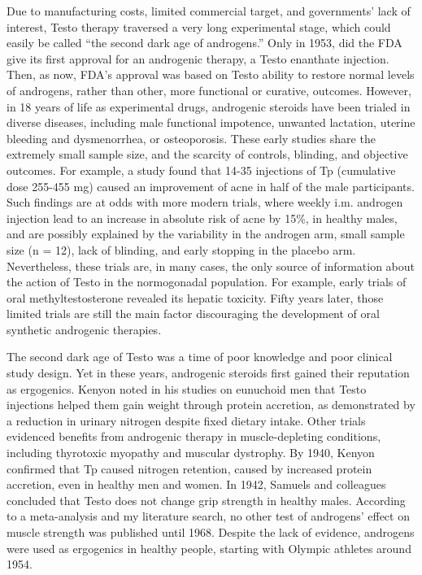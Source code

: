 \documentclass[12pt,english]{report}\usepackage[]{graphicx}\usepackage[]{color}
\begin{document}
Due to manufacturing costs, limited commercial target, and governments'
lack of interest, Testo therapy traversed a very long experimental
stage, which could easily be called ``the second dark age of androgens.''
Only in 1953, did the FDA give its first approval for an androgenic
therapy, a Testo enanthate injection. Then, as now, FDA's approval
was based on Testo ability to restore normal levels of androgens,
rather than other, more functional or curative, outcomes\citep{endopharmaceuticalssolutionsinc.2014delatestryl}.
However, in 18 years of life as experimental drugs, androgenic steroids
have been trialed in diverse diseases, including male functional impotence\citep{spence1940testosterone},
unwanted lactation\citep{kurzrok1938inhibition}, uterine bleeding
and dysmenorrhea\citep{black1942use}, or osteoporosis\citep{reifenstein1947metabolic}.
These early studies share the extremely small sample size, and the
scarcity of controls, blinding, and objective outcomes. For example,
a study found that 14-35 injections of Tp (cumulative dose 255-455
mg) caused an improvement of acne in half of the male participants\citep{molitch1938treatment}.
Such findings are at odds with more modern trials, where weekly i.m.
androgen injection lead to an increase in absolute risk of acne by
15\%, in healthy males\citep{mommers2008male}, and are possibly explained
by the variability in the androgen arm, small sample size (n = 12),
lack of blinding, and early stopping in the placebo arm. Nevertheless,
these trials are, in many cases, the only source of information about
the action of Testo in the normogonadal population. For example, early
trials of oral methyltestosterone revealed its hepatic toxicity. Fifty
years later, those limited trials are still the main factor discouraging
the development of oral synthetic androgenic therapies.

The second dark age of Testo was a time of poor knowledge and poor
clinical study design. Yet in these years, androgenic steroids first
gained their reputation as ergogenics. Kenyon noted in his studies
on eunuchoid men that Testo injections helped them gain weight through
protein accretion, as demonstrated by a reduction in urinary nitrogen
despite fixed dietary intake. Other trials evidenced benefits from
androgenic therapy in muscle-depleting conditions, including thyrotoxic
myopathy\citep{kinsell1944effect} and muscular dystrophy\citep{hesser1940muscle}.
By 1940, Kenyon confirmed that Tp caused nitrogen retention, caused
by increased protein accretion, even in healthy men and women\citep{kenyon1940comparative}.
In 1942, Samuels and colleagues concluded that Testo does not change
grip strength in healthy males\citep{samuels1942influence}. According
to a meta-analysis\citep{elashoff1991effects} and my literature search,
no other test of androgens' effect on muscle strength was published
until 1968. Despite the lack of evidence, androgens were used as ergogenics
in healthy people, starting with Olympic athletes around 1954\citep{cowart1987steroids}.
\end{document}
